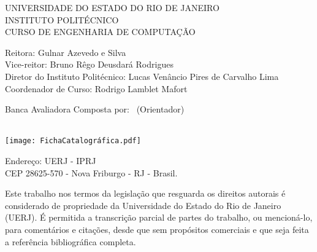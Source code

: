 \newcommand{\imprimircatalogacao}{%
    \noindent
    UNIVERSIDADE DO ESTADO DO RIO DE JANEIRO\\
    INSTITUTO POLITÉCNICO\\
    CURSO DE ENGENHARIA DE COMPUTAÇÃO
    
    \vspace{1cm}
    \noindent
    Reitora: Gulnar Azevedo e Silva\\
    Vice-reitor: Bruno Rêgo Deusdará Rodrigues\\
    Diretor do Instituto Politécnico: Lucas Venâncio Pires de Carvalho Lima\\
    Coordenador de Curso: Rodrigo Lamblet Mafort
    
    \vspace{1cm}
    \noindent
    Banca Avaliadora Composta por: \imprimirorientador~(Orientador)\\
    \hspace*{6.3cm}\membrobancaA\\
    \hspace*{6.3cm}\membrobancaB
    
    \vspace{0.5cm}
    \noindent
    \texttt{[image: FichaCatalográfica.pdf]}
    
    \pagenumbering{gobble}
    \vspace{0.5cm}
    \noindent
    Endereço: UERJ - IPRJ\\
    \hspace*{2cm} CEP 28625-570 - Nova Friburgo - RJ - Brasil.
    
    \vspace{0.5cm}
    \noindent
    Este trabalho nos termos da legislação que resguarda os direitos autorais é considerado de propriedade da Universidade do Estado do Rio de Janeiro (UERJ). É permitida a transcrição parcial de partes do trabalho, ou mencioná-lo, para comentários e citações, desde que sem propósitos comerciais e que seja feita a referência bibliográfica completa.
    \begin{flushright}
        \assinatura{\imprimirautor}
    \end{flushright}
}

\imprimircatalogacao
{}